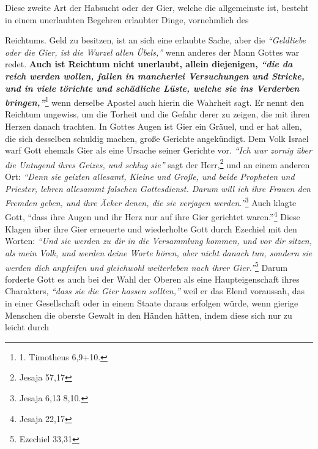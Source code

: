 Diese zweite Art der Habsucht oder der Gier, welche die allgemeinste ist,
besteht in einem unerlaubten Begehren erlaubter Dinge, vornehmlich des

 Reichtums. Geld zu besitzen, ist an sich eine erlaubte Sache, aber die
\textit{"`Geldliebe oder die Gier, ist die Wurzel allen Übels,"'} wenn anderes
der Mann
Gottes war redet. \label{ref:13_05_reichtum} \textbf{Auch ist
Reichtum nicht unerlaubt, allein diejenigen,
\textit{"`die da reich werden wollen, fallen in mancherlei Versuchungen und
Stricke, und in
viele törichte und schädliche Lüste, welche sie ins Verderben
bringen,"'}}\footnote{1. Timotheus 6,9+10.}
wenn derselbe Apostel auch hierin die
Wahrheit sagt. Er nennt den Reichtum ungewiss, um die Torheit und die Gefahr
derer zu zeigen, die mit ihren Herzen danach trachten. In Gottes Augen ist
Gier ein Gräuel, und er hat allen, die sich desselben schuldig machen, große
Gerichte angekündigt. Dem Volk
Israel warf Gott ehemals Gier als eine
Ursache seiner Gerichte vor.
\textit{"`Ich war zornig über die Untugend ihres Geizes,
und schlug sie"'} sagt der Herr,\footnote{Jesaja 57,17}
und an einem anderen Ort:
\textit{"`Denn sie geizten
 allesamt, Kleine und Große, und beide Propheten und
Priester, lehren allesammt falschen Gottesdienst. Darum will ich ihre Frauen den
Fremden geben, und ihre Äcker denen, die sie verjagen werden."'}\footnote{Jesaja 6,13 8,10.}
Auch klagte Gott,
"`dass ihre Augen und ihr Herz nur auf ihre Gier
gerichtet waren."'\footnote{Jesaja 22,17}
Diese Klagen über ihre Gier erneuerte
und wiederholte Gott durch Ezechiel mit den Worten:
\textit{"`Und sie werden zu dir
in die Versammlung kommen, und vor dir sitzen, als mein Volk, und werden deine
Worte hören, aber nicht danach tun, sondern sie werden dich anpfeifen und
gleichwohl weiterleben nach ihrer Gier."'}\footnote{Ezechiel 33,31}
Darum forderte
Gott es auch bei der Wahl der Oberen als eine Haupteigenschaft ihres Charakters,
\textit{"`dass sie die Gier hassen sollten,"'} weil er das Elend voraussah, das
in einer
Gesellschaft oder in einem Staate daraus erfolgen würde, wenn
gierige Menschen
die oberste Gewalt in den Händen hätten, indem diese sich nur zu leicht durch
